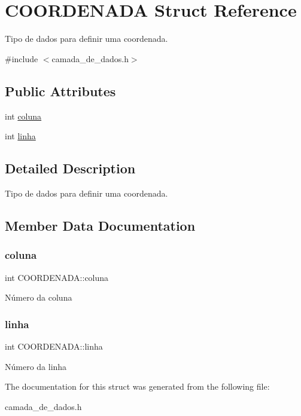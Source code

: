 \hypertarget{structCOORDENADA}{}\section{C\+O\+O\+R\+D\+E\+N\+A\+DA Struct Reference}
\label{structCOORDENADA}


Tipo de dados para definir uma coordenada.  




{\ttfamily \#include $<$camada\+\_\+de\+\_\+dados.\+h$>$}

\subsection*{Public Attributes}
\begin{DoxyCompactItemize}
\item 
int \hyperlink{structCOORDENADA_adfbc8d4856ce807139fdf62e00aed29a}{coluna}
\item 
int \hyperlink{structCOORDENADA_aefe14bcc5a066ac3b21500cc3d28c06f}{linha}
\end{DoxyCompactItemize}


\subsection{Detailed Description}
Tipo de dados para definir uma coordenada. 

\subsection{Member Data Documentation}
\mbox{\label{structCOORDENADA_adfbc8d4856ce807139fdf62e00aed29a}} 
\subsubsection{\texorpdfstring{coluna}{coluna}}
{\footnotesize\ttfamily int C\+O\+O\+R\+D\+E\+N\+A\+D\+A\+::coluna}

Número da coluna \mbox{\label{structCOORDENADA_aefe14bcc5a066ac3b21500cc3d28c06f}} 
\subsubsection{\texorpdfstring{linha}{linha}}
{\footnotesize\ttfamily int C\+O\+O\+R\+D\+E\+N\+A\+D\+A\+::linha}

Número da linha 

The documentation for this struct was generated from the following file\+:\begin{DoxyCompactItemize}
\item 
camada\+\_\+de\+\_\+dados.\+h\end{DoxyCompactItemize}
